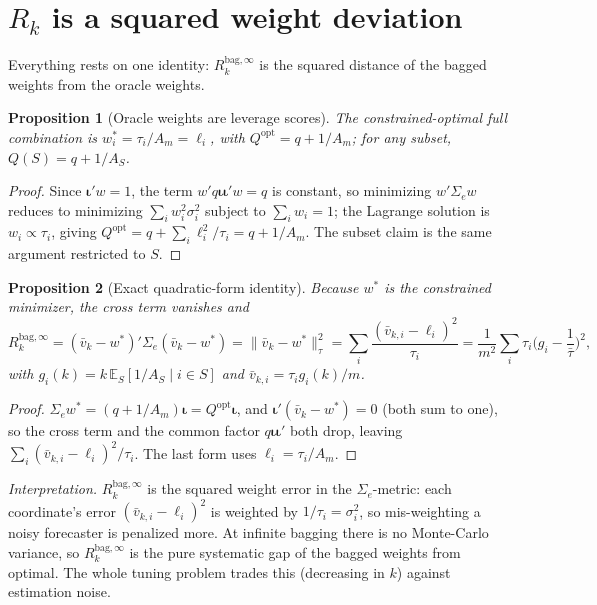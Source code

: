 \documentclass[11pt]{article}
\newcommand{\Sig}{\Sigma_e}
\newcommand{\E}{\mathbb{E}}
\newcommand{\Rk}{R_k^{\mathrm{bag},\infty}}
\newcommand{\Qopt}{Q^{\mathrm{opt}}}
\newcommand{\iotab}{\bm{\iota}}
\newtheorem{proposition}{Proposition}
\begin{document}
\section{$R_k$ is a squared weight deviation}\label{sec:identity}
Everything rests on one identity: $\Rk$ is the squared distance of the bagged weights from
the oracle weights.

\begin{proposition}[Oracle weights are leverage scores]\label{prop:oracle}
The constrained-optimal full combination is $w_i^\ast=\tau_i/A_m=\ell_i$, with
$\Qopt=q+1/A_m$; for any subset, $Q(S)=q+1/A_S$.
\end{proposition}
\begin{proof}
Since $\iotab'w=1$, the term $w'q\iotab\iotab'w=q$ is constant, so minimizing $w'\Sig w$
reduces to minimizing $\sum_iw_i^2\sigma_i^2$ subject to $\sum_iw_i=1$; the Lagrange
solution is $w_i\propto\tau_i$, giving $\Qopt=q+\sum_i\ell_i^2/\tau_i=q+1/A_m$. The subset
claim is the same argument restricted to $S$.
\end{proof}

\begin{proposition}[Exact quadratic-form identity]\label{prop:identity}
Because $w^\ast$ is the constrained minimizer, the cross term vanishes and
\[
  \Rk=(\bar v_k-w^\ast)'\Sig(\bar v_k-w^\ast)=\|\bar v_k-w^\ast\|_\tau^2
  =\sum_{i}\frac{(\bar v_{k,i}-\ell_i)^2}{\tau_i}
  =\frac{1}{m^2}\sum_i\tau_i\Big(g_i-\frac1{\bar\tau}\Big)^2,
\]
with $g_i(k)=k\,\E_S[1/A_S\mid i\in S]$ and $\bar v_{k,i}=\tau_i g_i(k)/m$.
\end{proposition}
\begin{proof}
$\Sig w^\ast=(q+1/A_m)\iotab=\Qopt\iotab$, and $\iotab'(\bar v_k-w^\ast)=0$ (both sum to
one), so the cross term and the common factor $q\iotab\iotab'$ both drop, leaving
$\sum_i(\bar v_{k,i}-\ell_i)^2/\tau_i$. The last form uses $\ell_i=\tau_i/A_m$.
\end{proof}

\noindent\emph{Interpretation.} $\Rk$ is the squared weight error in the $\Sig$-metric:
each coordinate's error $(\bar v_{k,i}-\ell_i)^2$ is weighted by $1/\tau_i=\sigma_i^2$, so
mis-weighting a noisy forecaster is penalized more. At infinite bagging there is no
Monte-Carlo variance, so $\Rk$ is the pure systematic gap of the bagged weights from
optimal. The whole tuning problem trades this (decreasing in $k$) against estimation noise.
\end{document}
